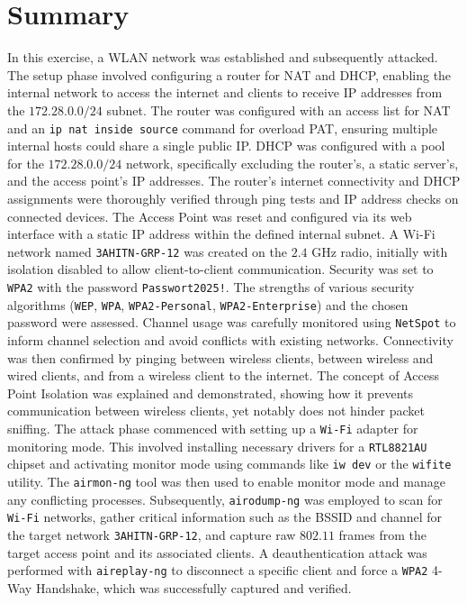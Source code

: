 \documentclass[a4paper]{article}
\begin{document}
\section{Summary}
In this exercise, a WLAN network was established and subsequently attacked. The setup phase involved configuring a router for NAT and DHCP, enabling the internal network to access the internet and clients to receive IP addresses from the \(172.28.0.0/24\) subnet. The router was configured with an access list for NAT and an \texttt{ip nat inside source} command for overload PAT, ensuring multiple internal hosts could share a single public IP. DHCP was configured with a pool for the \(172.28.0.0/24\) network, specifically excluding the router's, a static server's, and the access point's IP addresses. The router's internet connectivity and DHCP assignments were thoroughly verified through ping tests and IP address checks on connected devices.\nl
The Access Point was reset and configured via its web interface with a static IP address within the defined internal subnet. A Wi-Fi network named \texttt{3AHITN-GRP-12} was created on the \(2.4\) GHz radio, initially with isolation disabled to allow client-to-client communication. Security was set to \texttt{WPA2} with the password \texttt{Passwort2025!}. The strengths of various security algorithms (\texttt{WEP}, \texttt{WPA}, \texttt{WPA2-Personal}, \texttt{WPA2-Enterprise}) and the chosen password were assessed. Channel usage was carefully monitored using \texttt{NetSpot} to inform channel selection and avoid conflicts with existing networks. Connectivity was then confirmed by pinging between wireless clients, between wireless and wired clients, and from a wireless client to the internet. The concept of Access Point Isolation was explained and demonstrated, showing how it prevents communication between wireless clients, yet notably does not hinder packet sniffing.\nl
The attack phase commenced with setting up a \texttt{Wi-Fi} adapter for monitoring mode. This involved installing necessary drivers for a \texttt{RTL8821AU} chipset and activating monitor mode using commands like \texttt{iw dev} or the \texttt{wifite} utility. The \texttt{airmon-ng} tool was then used to enable monitor mode and manage any conflicting processes. Subsequently, \texttt{airodump-ng} was employed to scan for \texttt{Wi-Fi} networks, gather critical information such as the BSSID and channel for the target network \texttt{3AHITN-GRP-12}, and capture raw \(802.11\) frames from the target access point and its associated clients. A deauthentication attack was performed with \texttt{aireplay-ng} to disconnect a specific client and force a \texttt{WPA2} 4-Way Handshake, which was successfully captured and verified.\nl
\end{document}
